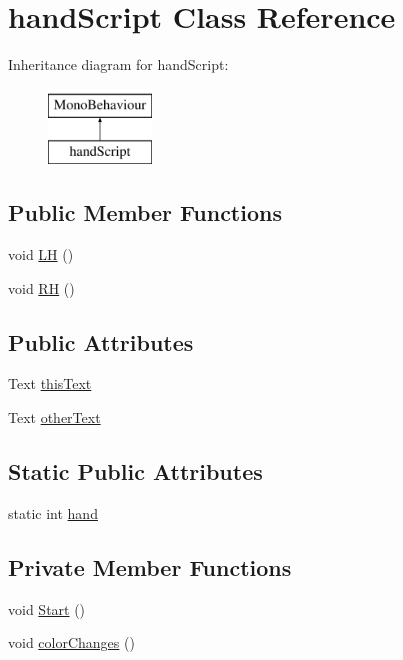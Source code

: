 \hypertarget{classhand_script}{\section{hand\-Script Class Reference}
\label{classhand_script}
}
Inheritance diagram for hand\-Script\-:\begin{figure}[H]
\begin{center}
\leavevmode
\includegraphics[height=2.000000cm]{classhand_script}
\end{center}
\end{figure}
\subsection*{Public Member Functions}
\begin{DoxyCompactItemize}
\item 
void \hyperlink{classhand_script_a62e593760441c466a04fd26d536cb67a}{L\-H} ()
\item 
void \hyperlink{classhand_script_a64481676bd93e645bed1e263edade065}{R\-H} ()
\end{DoxyCompactItemize}
\subsection*{Public Attributes}
\begin{DoxyCompactItemize}
\item 
Text \hyperlink{classhand_script_a2f300212a9a7f2528c525060eb9d17e4}{this\-Text}
\item 
Text \hyperlink{classhand_script_a2e323ace258263f11a78df53dd7644bd}{other\-Text}
\end{DoxyCompactItemize}
\subsection*{Static Public Attributes}
\begin{DoxyCompactItemize}
\item 
static int \hyperlink{classhand_script_a6ead5b70e39c2831d69fdab64c1226ff}{hand}
\end{DoxyCompactItemize}
\subsection*{Private Member Functions}
\begin{DoxyCompactItemize}
\item 
void \hyperlink{classhand_script_a17986f73e63381c246a9b4b453278fc7}{Start} ()
\item 
void \hyperlink{classhand_script_ac872a547fa3bf7c1a9c800c8d9bdff67}{color\-Changes} ()
\end{DoxyCompactItemize}


